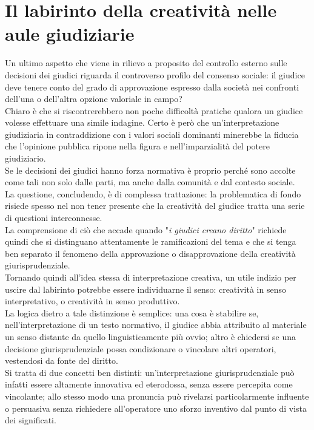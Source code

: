 \section{Il labirinto della creatività nelle aule giudiziarie}
Un ultimo aspetto che viene in rilievo a proposito del controllo esterno sulle decisioni dei giudici riguarda il controverso profilo del consenso sociale: il giudice deve tenere conto del grado di approvazione espresso dalla società nei confronti dell'una o dell'altra opzione valoriale in campo?
\\Chiaro è che si riscontrerebbero non poche difficoltà pratiche qualora un giudice volesse effettuare una simile indagine.
Certo è però che un'interpretazione giudiziaria in contraddizione con i valori sociali dominanti minerebbe la fiducia che l'opinione pubblica ripone nella figura e nell'imparzialità del potere giudiziario.
\\Se le decisioni dei giudici hanno forza normativa è proprio perché sono accolte come tali non solo dalle parti, ma anche dalla comunità e dal contesto sociale.
\\La questione, concludendo, è di complessa trattazione: la problematica di fondo risiede spesso nel non tener presente che la creatività del giudice tratta una serie di questioni interconnesse.
\\La comprensione di ciò che accade quando "\textit{i giudici creano diritto}" richiede quindi che si distinguano attentamente le ramificazioni del tema e che si tenga ben separato il fenomeno della approvazione o disapprovazione della creatività giurisprudenziale.
\\Tornando quindi all'idea stessa di interpretazione creativa, un utile indizio per uscire dal labirinto potrebbe essere individuarne il senso: creatività in senso interpretativo, o creatività in senso produttivo.
\\La logica dietro a tale distinzione è semplice: una cosa è stabilire se, nell'interpretazione di un testo normativo, il giudice abbia attribuito al materiale un senso distante da quello linguisticamente più ovvio; altro è chiedersi se una decisione giurisprudenziale possa condizionare o vincolare altri operatori, vestendosi da fonte del diritto.
\\Si tratta di due concetti ben distinti: un'interpretazione giurisprudenziale può infatti essere altamente innovativa ed eterodossa, senza essere percepita come vincolante; allo stesso modo una pronuncia può rivelarsi particolarmente influente o persuasiva senza richiedere all'operatore uno sforzo inventivo dal punto di vista dei significati.
